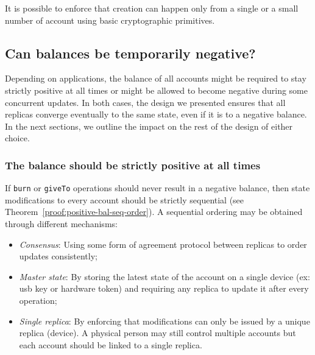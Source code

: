 \documentclass[9pt, oneside]{article}   	%
\begin{document}
It is possible to enforce that creation can happen only from a single or a small number of account using basic cryptographic primitives.


\subsection{Can balances be temporarily negative?}
\label{sec:design-neg-balance-choice}

Depending on applications, the balance of all accounts might be required to stay strictly positive at all times or might be allowed to become negative during some concurrent updates. In both cases, the design we presented ensures that all replicas converge eventually to the same state, even if it is to a negative balance. In the next sections, we outline the impact on the rest of the design of either choice.

\subsubsection{The balance should be strictly positive at all times}

If \texttt{burn} or \texttt{giveTo} operations should never result in a negative balance, then state modifications to every account should be strictly sequential (see Theorem~\ref{proof:positive-bal-seq-order}). A sequential ordering may be obtained through different mechanisms:
\begin{itemize}
    \item \textit{Consensus}: Using some form of agreement protocol between replicas to order updates consistently;
    \item \textit{Master state}: By storing the latest state of the account on a single device (ex: usb key or hardware token) and requiring any replica to update it after every operation;
    \item \textit{Single replica}: By enforcing that modifications can only be issued by a unique replica (device). A physical person may still control multiple accounts but each account should be linked to a single replica.
\end{itemize}
\end{document}
